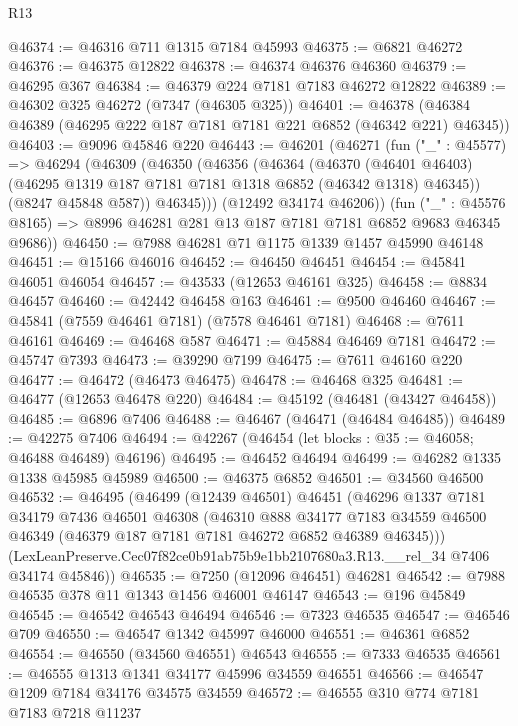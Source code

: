 \begin{lexlean}{R13}
\begin{coremodule}
@46374 := @46316 @711 @1315 @7184 @45993
@46375 := @6821 @46272
@46376 := @46375 @12822
@46378 := @46374 @46376 @46360
@46379 := @46295 @367
@46384 := @46379 @224 @7181 @7183 @46272 @12822
@46389 := @46302 @325 @46272 (@7347 (@46305 @325))
@46401 := @46378 (@46384 @46389 (@46295 @222 @187 @7181 @7181 @221 @6852 (@46342 @221) @46345))
@46403 := @9096 @45846 @220
@46443 := @46201
    (@46271
      (fun ("_" : @45577) =>
      @46294
        (@46309
          (@46350
            (@46356
              (@46364
                (@46370
                  (@46401 @46403)
                  (@46295 @1319 @187 @7181 @7181 @1318 @6852 (@46342 @1318) @46345))
                (@8247 @45848 @587))
              @46345)))
        (@12492 @34174 @46206))
      (fun ("_" : @45576 @8165) => @8996 @46281 @281 @13 @187 @7181 @7181 @6852 @9683 @46345 @9686))
@46450 := @7988 @46281 @71 @1175 @1339 @1457 @45990 @46148
@46451 := @15166 @46016
@46452 := @46450 @46451
@46454 := @45841 @46051 @46054
@46457 := @43533 (@12653 @46161 @325)
@46458 := @8834 @46457
@46460 := @42442 @46458 @163
@46461 := @9500 @46460
@46467 := @45841 (@7559 @46461 @7181) (@7578 @46461 @7181)
@46468 := @7611 @46161
@46469 := @46468 @587
@46471 := @45884 @46469 @7181
@46472 := @45747 @7393
@46473 := @39290 @7199
@46475 := @7611 @46160 @220
@46477 := @46472 (@46473 @46475)
@46478 := @46468 @325
@46481 := @46477 (@12653 @46478 @220)
@46484 := @45192 (@46481 (@43427 @46458))
@46485 := @6896 @7406
@46488 := @46467 (@46471 (@46484 @46485))
@46489 := @42275 @7406
@46494 := @42267 (@46454 (let blocks : @35 := @46058; @46488 @46489) @46196)
@46495 := @46452 @46494
@46499 := @46282 @1335 @1338 @45985 @45989
@46500 := @46375 @6852
@46501 := @34560 @46500
@46532 := @46495
    (@46499
      (@12439 @46501)
      @46451
      (@46296
        @1337
        @7181
        @34179
        @7436
        @46501
        @46308
        (@46310
          @888
          @34177
          @7183
          @34559
          @46500
          @46349
          (@46379 @187 @7181 @7181 @46272 @6852 @46389 @46345)))
      (LexLeanPreserve.Cec07f82ce0b91ab75b9e1bb2107680a3.R13.__rel_34 @7406 @34174 @45846))
@46535 := @7250 (@12096 @46451) @46281
@46542 := @7988 @46535 @378 @11 @1343 @1456 @46001 @46147
@46543 := @196 @45849
@46545 := @46542 @46543 @46494
@46546 := @7323 @46535
@46547 := @46546 @709
@46550 := @46547 @1342 @45997 @46000
@46551 := @46361 @6852
@46554 := @46550 (@34560 @46551) @46543
@46555 := @7333 @46535
@46561 := @46555 @1313 @1341 @34177 @45996 @34559 @46551
@46566 := @46547 @1209 @7184 @34176 @34575 @34559
@46572 := @46555 @310 @774 @7181 @7183 @7218 @11237

\end{coremodule}
\end{lexlean}
